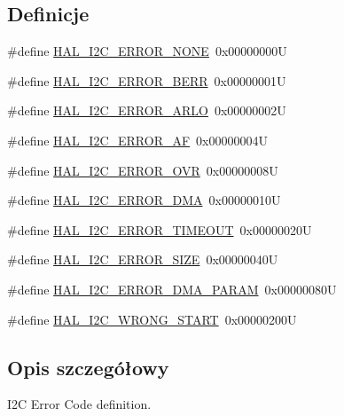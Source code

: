 \subsection*{Definicje}
\begin{DoxyCompactItemize}
\item 
\#define \hyperlink{group___i2_c___error___code__definition_ga0b8ca289091d942032c89484b6211d0d}{H\+A\+L\+\_\+\+I2\+C\+\_\+\+E\+R\+R\+O\+R\+\_\+\+N\+O\+NE}~0x00000000U
\item 
\#define \hyperlink{group___i2_c___error___code__definition_gab9f6e39431ee764ada50fd63f0ad2fbf}{H\+A\+L\+\_\+\+I2\+C\+\_\+\+E\+R\+R\+O\+R\+\_\+\+B\+E\+RR}~0x00000001U
\item 
\#define \hyperlink{group___i2_c___error___code__definition_ga048b36222884bfe80ce2d37fa868690b}{H\+A\+L\+\_\+\+I2\+C\+\_\+\+E\+R\+R\+O\+R\+\_\+\+A\+R\+LO}~0x00000002U
\item 
\#define \hyperlink{group___i2_c___error___code__definition_gad1cc236ad6ba5cafe66aecb0dbedc65a}{H\+A\+L\+\_\+\+I2\+C\+\_\+\+E\+R\+R\+O\+R\+\_\+\+AF}~0x00000004U
\item 
\#define \hyperlink{group___i2_c___error___code__definition_ga38d8f9beb4c681eba786f6154d4f594a}{H\+A\+L\+\_\+\+I2\+C\+\_\+\+E\+R\+R\+O\+R\+\_\+\+O\+VR}~0x00000008U
\item 
\#define \hyperlink{group___i2_c___error___code__definition_gae1091e9e82dcfcfef247b214a11c9db3}{H\+A\+L\+\_\+\+I2\+C\+\_\+\+E\+R\+R\+O\+R\+\_\+\+D\+MA}~0x00000010U
\item 
\#define \hyperlink{group___i2_c___error___code__definition_gaeb3bedf36d78ddf3284a68494ab9d089}{H\+A\+L\+\_\+\+I2\+C\+\_\+\+E\+R\+R\+O\+R\+\_\+\+T\+I\+M\+E\+O\+UT}~0x00000020U
\item 
\#define \hyperlink{group___i2_c___error___code__definition_ga98027ff2d2fda2c793b07168ded747a4}{H\+A\+L\+\_\+\+I2\+C\+\_\+\+E\+R\+R\+O\+R\+\_\+\+S\+I\+ZE}~0x00000040U
\item 
\#define \hyperlink{group___i2_c___error___code__definition_gacb922e1386469dce306f548cfd5c1277}{H\+A\+L\+\_\+\+I2\+C\+\_\+\+E\+R\+R\+O\+R\+\_\+\+D\+M\+A\+\_\+\+P\+A\+R\+AM}~0x00000080U
\item 
\#define \hyperlink{group___i2_c___error___code__definition_ga11c7f5f8607c221d84ef731fc761978a}{H\+A\+L\+\_\+\+I2\+C\+\_\+\+W\+R\+O\+N\+G\+\_\+\+S\+T\+A\+RT}~0x00000200U
\end{DoxyCompactItemize}


\subsection{Opis szczegółowy}
I2C Error Code definition. 



